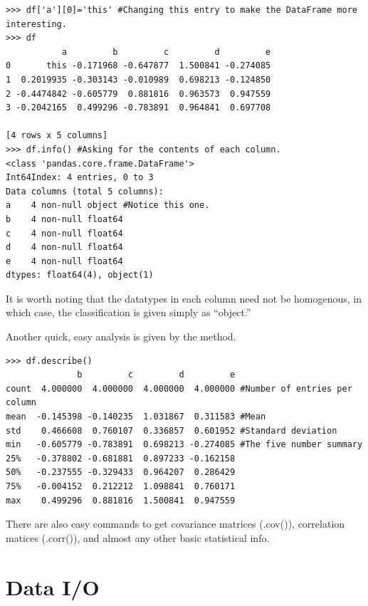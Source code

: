 \begin{lstlisting}
>>> df['a'][0]='this' #Changing this entry to make the DataFrame more interesting.
>>> df
           a         b         c         d         e
0       this -0.171968 -0.647877  1.500841 -0.274085
1  0.2019935 -0.303143 -0.010989  0.698213 -0.124850
2 -0.4474842 -0.605779  0.881816  0.963573  0.947559
3 -0.2042165  0.499296 -0.783891  0.964841  0.697708

[4 rows x 5 columns]
>>> df.info() #Asking for the contents of each column.
<class 'pandas.core.frame.DataFrame'>
Int64Index: 4 entries, 0 to 3
Data columns (total 5 columns):
a    4 non-null object #Notice this one.
b    4 non-null float64
c    4 non-null float64
d    4 non-null float64
e    4 non-null float64
dtypes: float64(4), object(1)
\end{lstlisting}

It is worth noting that the datatypes in each column need not be homogenous, in which case, the classification is given simply as ``object.''

Another quick, easy analysis is given by the  method.

\begin{lstlisting}
>>> df.describe()
              b         c         d         e
count  4.000000  4.000000  4.000000  4.000000 #Number of entries per column
mean  -0.145398 -0.140235  1.031867  0.311583 #Mean
std    0.466608  0.760107  0.336857  0.601952 #Standard deviation
min   -0.605779 -0.783891  0.698213 -0.274085 #The five number summary
25%   -0.378802 -0.681881  0.897233 -0.162158
50%   -0.237555 -0.329433  0.964207  0.286429
75%   -0.004152  0.212212  1.098841  0.760171
max    0.499296  0.881816  1.500841  0.947559
\end{lstlisting}

There are also easy commands to get covariance matrices (.cov()), correlation matices (.corr()), and almost any other basic statistical info.



\section*{Data I/O}

